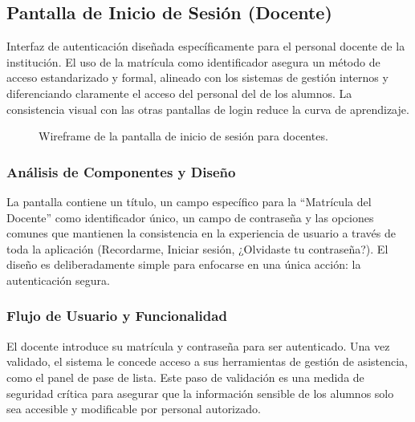 \subsection{ Pantalla de Inicio de Sesión (Docente)}
\begin{samepage}\small
Interfaz de autenticación diseñada específicamente para el personal docente de la institución. El uso de la matrícula como identificador asegura un método de acceso estandarizado y formal, alineado con los sistemas de gestión internos y diferenciando claramente el acceso del personal del de los alumnos. La consistencia visual con las otras pantallas de login reduce la curva de aprendizaje.
\begin{figure}[H]\centering
    \caption{Wireframe de la pantalla de inicio de sesión para docentes.}\label{fig:wf-login-teacher}
\end{figure}
    \subsubsection*{Análisis de Componentes y Diseño}
    La pantalla contiene un título, un campo específico para la ``Matrícula del Docente'' como identificador único, un campo de contraseña y las opciones comunes que mantienen la consistencia en la experiencia de usuario a través de toda la aplicación (Recordarme, Iniciar sesión, ¿Olvidaste tu contraseña?). El diseño es deliberadamente simple para enfocarse en una única acción: la autenticación segura.
    
    \subsubsection*{Flujo de Usuario y Funcionalidad}
    El docente introduce su matrícula y contraseña para ser autenticado. Una vez validado, el sistema le concede acceso a sus herramientas de gestión de asistencia, como el panel de pase de lista. Este paso de validación es una medida de seguridad crítica para asegurar que la información sensible de los alumnos solo sea accesible y modificable por personal autorizado.
\normalsize\end{samepage}
\clearpage

